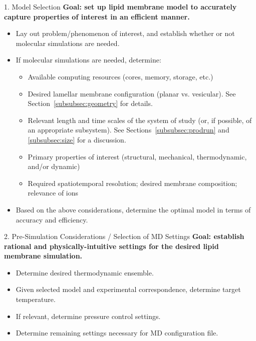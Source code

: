 \documentclass[9pt,bestpractices,pubversion]{livecoms}
\begin{document}

\begin{Checklists*}[p!]

\begin{checklist}{1. Model Selection}
\textbf{Goal: set up lipid membrane model to accurately capture properties of interest in an efficient manner.}
\begin{itemize}
\item Lay out problem/phenomenon of interest, and establish whether or not molecular simulations are needed.
\item If molecular simulations are needed, determine:
	\begin{itemize}
	\item Available computing resources (cores, memory, storage, etc.)
	\item Desired lamellar membrane configuration (planar vs. vesicular). See Section~\ref{subsubsec:geometry} for details.
	\item Relevant length and time scales of the system of study (or, if possible, of an appropriate subsystem). See Sections~\ref{subsubsec:prodrun} and \ref{subsubsec:size} for a discussion.
	\item Primary properties of interest (structural, mechanical, thermodynamic, and/or dynamic)
	\item Required spatiotemporal resolution; desired membrane composition; relevance of ions
	\end{itemize}
\item Based on the above considerations, determine the optimal model in terms of accuracy and efficiency.
\end{itemize}
\end{checklist}

\begin{checklist}{2. Pre-Simulation Considerations / Selection of MD Settings}
\textbf{Goal: establish rational and physically-intuitive settings for the desired lipid membrane simulation.}
\begin{itemize}
\item Determine desired thermodynamic ensemble.
\item Given selected model and experimental correspondence, determine target temperature.
\item If relevant, determine pressure control settings.
\item Determine remaining settings necessary for MD configuration file.
\end{itemize}
\end{checklist}


\end{Checklists*}
\end{document}
